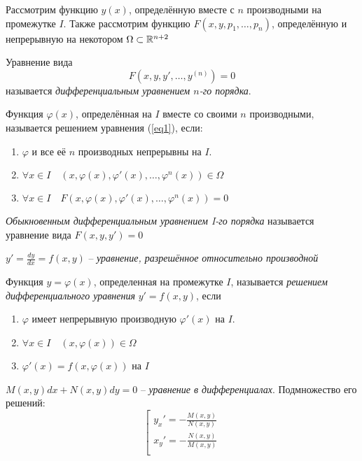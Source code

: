 Рассмотрим функцию $y(x)$, определённую вместе с $n$ производными на промежутке $I$. \newline Также рассмотрим функцию $F(x,y,p_1, \ldots,p_n)$, определённую и непрерывную на некотором $\Omega\subset \mathbb{R}^{n+2}$

\Def Уравнение вида 
\setcounter{equation}{0}
\begin{equation}\label{eq1} 
    F(x, y, y', \ldots, y^{(n)})=0
\end{equation}
называется \textit{дифференциальным уравнением $n$-го порядка}.

\Def Функция $\varphi(x)$, определённая на $I$ вместе со своими $n$ производными,
называется решением уравнения (\ref{eq1}), если:
\begin{enumerate}
    \item $\varphi$ и все её $n$ производных непрерывны на $I$.
    \item $\forall x \in I \quad (x, \varphi(x), \varphi'(x), \ldots, \varphi^{n}(x)) \in \Omega$
    \item $\forall x \in I \quad F(x, \varphi(x), \varphi'(x), \ldots, \varphi^{n}(x)) = 0$
\end{enumerate}

\Def \textit{Обыкновенным дифференциальным уравнением I-го порядка} называется уравнение вида $F(x,y,y') = 0$

\Def $y'=\frac{dy}{dx}=f(x,y)$ -- \textit{уравнение, разрешённое относительно производной}

\Def Функция $y = \varphi(x)$, определенная на промежутке $I$, называется \textit{решением дифференциального уравнения} $y'=f(x,y)$, если 
\begin{enumerate}
    \item $\varphi$ имеет непрерывную производную $\varphi'(x)$ на $I$.
    \item $\forall x \in I \quad (x, \varphi(x)) \in \Omega$
    \item $\varphi'(x) = f(x,\varphi(x))$ на $I$
\end{enumerate}

\Def $M(x,y)dx + N(x,y)dy = 0$ -- \textit{уравнение в дифференциалах}. Подмножество его решений:
\begin{equation*}
    \left[ 
      \begin{gathered} 
        y_x' = -\frac{M(x,y)}{N(x,y)} \\ 
        x_y' = -\frac{N(x,y)}{M(x,y)} \\ 
      \end{gathered} 
\right.
\end{equation*}





